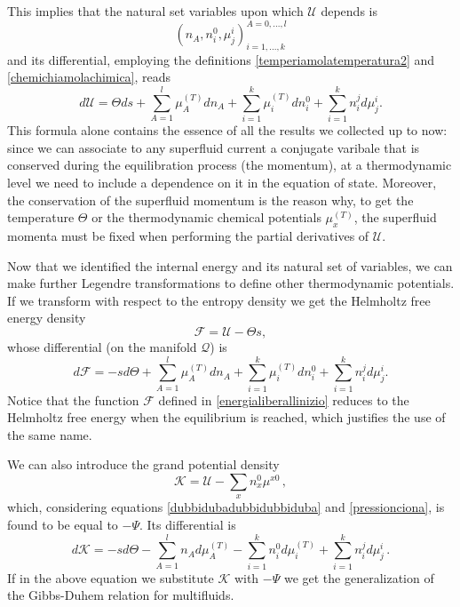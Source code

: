\documentclass[usenatbib]{mnras}
\begin{document}
%
This implies that the natural set variables upon which $\mathcal{U}$ depends is 
%
\begin{equation}\label{chartofU}
(n_A,n_i^0,\mu_j^i)^{A=0,...,l}_{i=1,...,k}
\end{equation}
%
and its differential, employing the definitions \eqref{temperiamolatemperatura2} and \eqref{chemichiamolachimica}, reads
%
\begin{equation}\label{ilcentroditutto}
d\mathcal{U} =\Theta ds + \sum_{A=1}^l \mu_A^{(T)} dn_A + \sum_{i=1}^k \mu_i^{(T)} dn_i^0 + \sum_{i=1}^k  n_i^j d\mu^i_j.
\end{equation}
%
This formula alone contains the essence of all the results we collected up to now: since we can associate to any superfluid current a conjugate varibale that is conserved during the equilibration process (the momentum), at a thermodynamic level we need to include a dependence on it in the equation of state. 
Moreover, the conservation of the superfluid momentum is the reason why, to get the temperature $\Theta$ or the thermodynamic chemical potentials $\mu_x^{(T)}$, the superfluid momenta must be fixed when performing the partial derivatives of $\mathcal{U}$.

Now that we identified the internal energy and its natural set of variables, we can make further Legendre transformations to define other thermodynamic potentials. If we transform with respect to the entropy density we get the Helmholtz free energy density
%
\begin{equation}
\mathcal{F} = \mathcal{U} - \Theta s ,
\end{equation}
%
whose differential (on the manifold $\mathcal{Q}$) is
%
\begin{equation}
d\mathcal{F} = -s d\Theta + \sum_{A=1}^l \mu_A^{(T)} dn_A + \sum_{i=1}^k \mu_i^{(T)} dn_i^0 + \sum_{i=1}^k  n_i^j d\mu^i_j.
\end{equation}
%
Notice that the function $\mathcal{F}$ defined in \eqref{energialiberallinizio} reduces to the Helmholtz free energy when the equilibrium is reached, which justifies the use of the same name.

We can also introduce the grand potential density
%
\begin{equation}
\mathcal{K} = \mathcal{U}-\sum_x n_x^0 \mu^{x0} \, , 
\label{grandpotential}
\end{equation}
%
which, considering equations \eqref{dubbidubadubbidubbiduba} and \eqref{pressionciona}, is found to be equal to $-\Psi$. Its differential is
%
\begin{equation}
d \mathcal{K}  = -s d \Theta - \sum_{A=1}^l n_{A} d\mu_{A}^{(T)}  - \sum_{i=1}^k n_{i}^0 d\mu_{i}^{(T)}  + \sum_{i=1}^k n_{i}^j d\mu_{j}^i \, .
\end{equation}
%
If in the above equation we substitute $\mathcal{K}$ with $-\Psi$ we get the generalization of the Gibbs-Duhem  relation for multifluids. 
\end{document}
